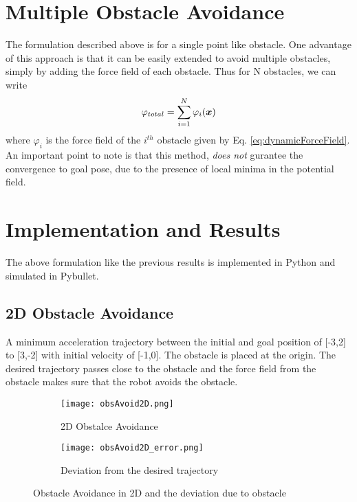 \section{Multiple Obstacle Avoidance}
The formulation described above is for a single point like obstacle. One advantage of this approach is that it can be 
easily extended to avoid multiple obstacles, simply by adding the force field of each obstacle. 
Thus for N obstacles, we can write
\begin{equation}
    \varphi_{total} = \sum\limits_{i=1}^N \varphi_{i}(\boldsymbol{x})
\end{equation}
where $\varphi_{i}$ is the force field of the $i^{th}$ obstacle given by Eq. \ref{eq:dynamicForceField}.
An important point to note is that this method, \textit{does not} gurantee the convergence to goal pose,
due to the presence of local minima in the potential field.

\section{Implementation and Results}
The above formulation like the previous results is implemented in Python and simulated in Pybullet.

\subsection{2D Obstacle Avoidance}
A minimum acceleration trajectory between the initial and goal position of [-3,2] to [3,-2] with initial velocity of [-1,0]. The obstacle
is placed at the origin. The desired trajectory passes close to the obstacle and the force field from the obstacle makes sure that
the robot avoids the obstacle.

\begin{figure}[h]
    \centering
    \begin{subfigure}{0.5\textwidth}
        \texttt{[image: obsAvoid2D.png]}
        \caption{2D Obstalce Avoidance}
        \label{fig:obsAvoid2D}
    \end{subfigure}%
    \begin{subfigure}{0.5\textwidth}
        \centering
        \texttt{[image: obsAvoid2D\_error.png]}
        \caption{Deviation from the desired trajectory}
        \label{fig:obsAvoid2D_error}
    \end{subfigure}
    \caption{Obstacle Avoidance in 2D and the deviation due to obstacle}
    \label{fig:obsAvoid2D_total}
\end{figure}

